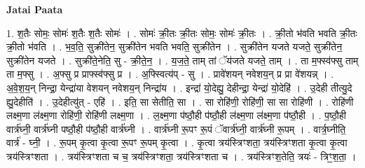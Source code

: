 \documentclass[17pt]{extarticle}
\begin{document}
\textbf{Jatai Paata} \newline

1. श॒तैः सोमः॒ सोमः॑ श॒तैः श॒तैः सोमः॑ । . सोमः॑ क्री॒तः क्री॒तः सोमः॒ सोमः॑ क्री॒तः । . क्री॒तो भ॑वति भवति क्री॒तः क्री॒तो भ॑वति । . भ॒व॒ति॒ सुक्री॑तेन॒ सुक्री॑तेन भवति भवति॒ सुक्री॑तेन । . सुक्री॑तेन यजते यजते॒ सुक्री॑तेन॒ सुक्री॑तेन यजते । . सुक्री॑ते॒नेति॒ सु - क्री॒ते॒न॒ । . य॒ज॒ते॒ ताम् तां ॅय॑जते यजते॒ ताम् । . ता म॒फ्स्व॑फ्सु ताम् ता म॒फ्सु । . अ॒फ्सु प्र प्राफ्स्व॑फ्सु प्र । . अ॒फ्स्वित्य॑प् - सु । . प्रावे॑शयन् नवेशय॒न् प्र प्रा वे॑शयन्न् । . अ॒वे॒श॒य॒न् निन्द्रा॒ येन्द्रा॑या वेशयन् नवेशय॒न् निन्द्रा॑य । . इन्द्रा॑ यो॒देह्यु॒ देहीन्द्रा॒ येन्द्रा॑ यो॒देहि॑ । . उ॒देही तीत्यु॒दे ह्यु॒देहीति॑ । . उ॒देहीत्यु॑त् - एहि॑ । . इति॒ सा सेतीति॒ सा । . सा रोहि॑णी॒ रोहि॑णी॒ सा सा रोहि॑णी । . रोहि॑णी लक्ष्म॒णा ल॑क्ष्म॒णा रोहि॑णी॒ रोहि॑णी लक्ष्म॒णा । . ल॒क्ष्म॒णा प॑ष्ठौ॒ही प॑ष्ठौ॒ही ल॑क्ष्म॒णा ल॑क्ष्म॒णा प॑ष्ठौ॒ही । . प॒ष्ठौ॒ही वार्त्र॑घ्नी॒ वार्त्र॑घ्नी पष्ठौ॒ही प॑ष्ठौ॒ही वार्त्र॑घ्नी । . वार्त्र॑घ्नी रू॒पꣳ रू॒पं ॅवार्त्र॑घ्नी॒ वार्त्र॑घ्नी रू॒पम् । . वार्त्र॒घ्नीति॒ वार्त्र॑ - घ्नी॒ । . रू॒पम् कृ॒त्वा कृ॒त्वा रू॒पꣳ रू॒पम् कृ॒त्वा । . कृ॒त्वा त्रय॑स्त्रिꣳशता॒ त्रय॑स्त्रिꣳशता कृ॒त्वा कृ॒त्वा त्रय॑स्त्रिꣳशता । . त्रय॑स्त्रिꣳशता च च॒ त्रय॑स्त्रिꣳशता॒ त्रय॑स्त्रिꣳशता च । . त्रय॑स्त्रिꣳश॒तेति॒ त्रयः॑ - त्रिꣳ॒॒श॒ता॒ । \newline
\end{document}
